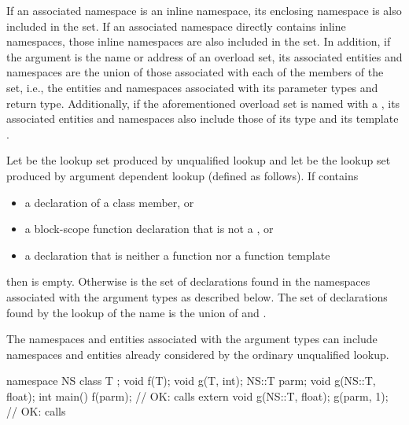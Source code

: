 If an associated namespace is an inline namespace, its
enclosing namespace is also included in the set. If an associated namespace
directly contains inline namespaces, those inline namespaces are also included
in the set.
In addition, if the argument is the name or address of an overload set,
its associated entities
and namespaces are the union of those associated with each of the
members of the set, i.e., the entities and namespaces associated with its
parameter types and return type.
Additionally, if the aforementioned overload set is named with
a , its associated entities and namespaces also include
those of its type  and its template
.

\pnum
Let  be the lookup set produced by unqualified
lookup and let  be the lookup set produced
by argument dependent lookup (defined as follows). If  contains
\begin{itemize}
\item a declaration of a class member, or
\item a block-scope function declaration that is not a , or
\item a declaration that is neither a function nor a function template
\end{itemize}
then  is empty. Otherwise  is the set of declarations
found in the namespaces associated with the argument types as described
below. The set of declarations found by the lookup of the name is the
union of  and .
\begin{note}
The namespaces and entities
associated with the argument types can include namespaces and entities
already considered by the ordinary unqualified lookup.
\end{note}
\begin{example}
\begin{codeblock}
namespace NS {
  class T { };
  void f(T);
  void g(T, int);
}
NS::T parm;
void g(NS::T, float);
int main() {
  f(parm);                      // OK: calls 
  extern void g(NS::T, float);
  g(parm, 1);                   // OK: calls 
}
\end{codeblock}
\end{example}

